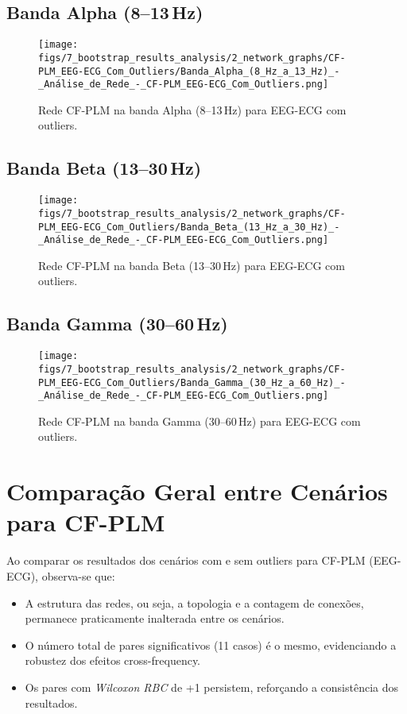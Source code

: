 \begin{apendicesenv}
    \subsection{Banda Alpha (8--13\,Hz)}
    \begin{figure}[H]
      \centering
      \texttt{[image: figs/7\_bootstrap\_results\_analysis/2\_network\_graphs/CF-PLM\_EEG-ECG\_Com\_Outliers/Banda\_Alpha\_(8\_Hz\_a\_13\_Hz)\_-\_Análise\_de\_Rede\_-\_CF-PLM\_EEG-ECG\_Com\_Outliers.png]}
      \caption{Rede CF-PLM na banda Alpha (8--13\,Hz) para EEG-ECG com outliers.}
      \label{fig:apend_cfplm_alpha_com}
    \end{figure}
    
    \subsection{Banda Beta (13--30\,Hz)}
    \begin{figure}[H]
      \centering
      \texttt{[image: figs/7\_bootstrap\_results\_analysis/2\_network\_graphs/CF-PLM\_EEG-ECG\_Com\_Outliers/Banda\_Beta\_(13\_Hz\_a\_30\_Hz)\_-\_Análise\_de\_Rede\_-\_CF-PLM\_EEG-ECG\_Com\_Outliers.png]}
      \caption{Rede CF-PLM na banda Beta (13--30\,Hz) para EEG-ECG com outliers.}
      \label{fig:apend_cfplm_beta_com}
    \end{figure}
    
    \subsection{Banda Gamma (30--60\,Hz)}
    \begin{figure}[H]
      \centering
      \texttt{[image: figs/7\_bootstrap\_results\_analysis/2\_network\_graphs/CF-PLM\_EEG-ECG\_Com\_Outliers/Banda\_Gamma\_(30\_Hz\_a\_60\_Hz)\_-\_Análise\_de\_Rede\_-\_CF-PLM\_EEG-ECG\_Com\_Outliers.png]}
      \caption{Rede CF-PLM na banda Gamma (30--60\,Hz) para EEG-ECG com outliers.}
      \label{fig:apend_cfplm_gamma_com}
    \end{figure}
    
    \section{Comparação Geral entre Cenários para CF-PLM}
    Ao comparar os resultados dos cenários com e sem outliers para CF-PLM (EEG-ECG), observa-se que:
    \begin{itemize}
        \item A estrutura das redes, ou seja, a topologia e a contagem de conexões, permanece praticamente inalterada entre os cenários.
        \item O número total de pares significativos (11 casos) é o mesmo, evidenciando a robustez dos efeitos cross-frequency.
        \item Os pares com \emph{Wilcoxon RBC} de +1 persistem, reforçando a consistência dos resultados.
    \end{itemize}
    
\end{apendicesenv}
